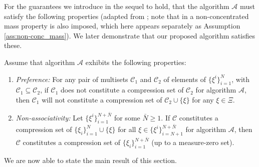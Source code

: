 For the guarantees we introduce in the sequel to hold, that the algorithm $\mathcal{A}$ must satisfy the following properties (adapted from \cite{DBLP:journals/jmlr/CampiG23}; note that in \cite{DBLP:journals/jmlr/CampiG23} a non-concentrated mass property is also imposed, which here appears separately as Assumption \ref{ass:non-conc_mass}). 
We later demonstrate that our proposed algorithm satisfies these.

\begin{assum}\label{ass:alg_prop}
Assume that algorithm $\mathcal{A}$ exhibits the following properties:
\begin{enumerate}[wide, labelwidth=!, labelindent=0pt]
	\item \emph{Preference:} For any pair of multisets $\mathcal{C}_1$ and $\mathcal{C}_2$ of elements of $\{\xi^i\}_{i=1}^N$, with $\mathcal{C}_1 \subseteq \mathcal{C}_2$, if  $\mathcal{C}_1$ does not constitute a compression set of $\mathcal{C}_2$ for algorithm $\mathcal{A}$, then $\mathcal{C}_1$ will not constitute a compression set of $\mathcal{C}_2 \cup\{\xi\}$ for any $\xi \in \Xi$.
	\item \emph{Non-associativity:} Let $\{\xi^i\}_{i=1}^{N+\bar{N}}$ for some $\bar{N} \geq 1$. If $\mathcal{C}$ constitutes a compression set of $\{\xi_i\}_{i=1}^{N} \cup \{\xi\}$ for all $\xi \in \{\xi^i\}_{i=N+1}^{N+\bar{N}}$ for algorithm $\mathcal{A}$, then $\mathcal{C}$ constitutes a compression set of $\{\xi_i\}_{i=1}^{N+\bar{N}}$ (up to a measure-zero set).
\end{enumerate}
\end{assum}

We are now able to state the main result of this section.

